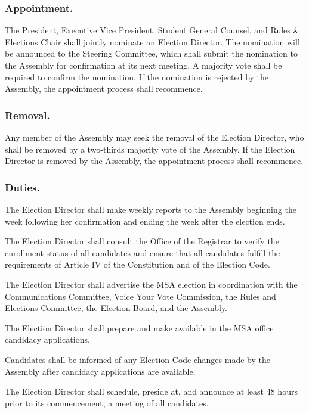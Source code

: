 \subsubsection{Appointment.}
The President, Executive Vice President, Student General Counsel, and Rules \& Elections Chair shall jointly nominate an Election Director.  The nomination will be announced to the Steering Committee, which shall submit the nomination to the Assembly for confirmation at its next meeting.  A majority vote shall be required to confirm the nomination.  If the nomination is rejected by the Assembly, the appointment process shall recommence.  

\subsubsection{Removal.}
Any member of the Assembly may seek the removal of the Election Director, who shall be removed by a two-thirds majority vote of the Assembly.    If the Election Director is removed by the Assembly, the appointment process shall recommence.

\subsubsection{Duties.}

\subsubsubsection{}
The Election Director shall make weekly reports to the Assembly beginning the week following her confirmation and ending the week after the election ends.

\subsubsubsection{}
The Election Director shall consult the Office of the Registrar to verify the enrollment status of all candidates and ensure that all candidates fulfill the requirements of Article IV of the Constitution and of the Election Code.

\subsubsubsection{}
The Election Director shall advertise the MSA election in coordination with the Communications Committee, Voice Your Vote Commission, the Rules and Elections Committee, the Election Board, and the Assembly.

\subsubsubsection{}
The Election Director shall prepare and make available in the MSA office candidacy applications.

\subsubsubsection{}
Candidates shall be informed of any Election Code changes made by the Assembly after candidacy applications are available.

\subsubsubsection{}
The Election Director shall schedule, preside at, and announce at least 48 hours prior to its commencement, a meeting of all candidates. 

